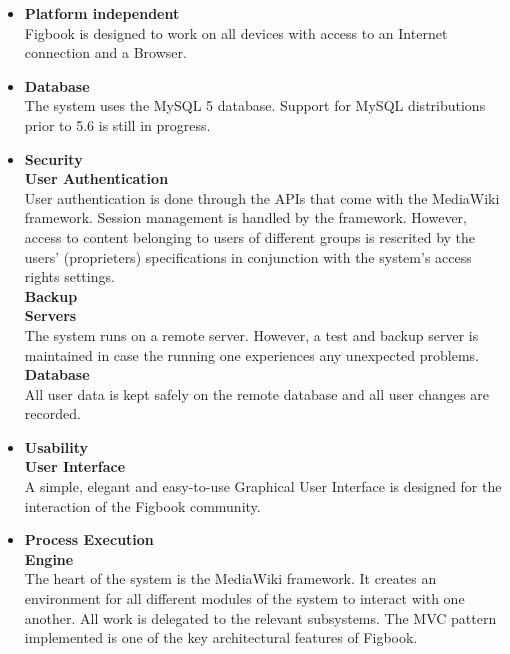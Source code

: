 %


\begin{itemize}	
		\item \textbf{Platform independent}\\
		Figbook is designed to work on all devices with access to an Internet connection and a Browser. 
\end{itemize}

\begin{itemize}	
		\item \textbf{Database}\\
		The system uses the MySQL 5 database. Support for MySQL distributions prior to 5.6 is still in progress.
\end{itemize}

\begin{itemize}	
		\item \textbf{Security}\\
		\textbf{User Authentication}\\
			User authentication is done through the APIs that come with the MediaWiki framework. Session management is handled by the framework. However, access to content belonging to users of different groups is rescrited by the users' (proprieters) specifications in conjunction with the system's access rights settings.\\
			
		\textbf{Backup}\\
		\textbf{Servers}\\
		  	The system runs on a remote server. However, a test and backup server is maintained in case the running one experiences any unexpected problems.
			\\
			\textbf{Database}\\
			All user data is kept safely on the remote database and all user changes are recorded.

		\item \textbf{Usability}\\
			\textbf{User Interface}\\
			A simple, elegant and easy-to-use Graphical User Interface is designed for the interaction of the Figbook community.
\end{itemize}

\begin{itemize}
	\item \textbf{Process Execution}\\
		\textbf{Engine}\\
		The heart of the system is the MediaWiki framework. It creates an environment for all different modules of the system to interact with one another. All work is delegated to the relevant subsystems. The MVC pattern implemented is one of the key architectural features of Figbook.
\end{itemize}